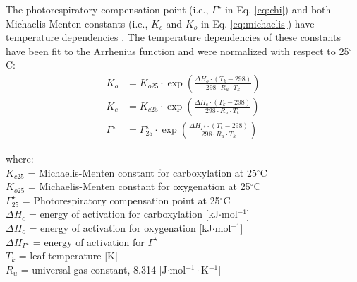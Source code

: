 \noindent The photorespiratory compensation point (i.e., $\Gamma^{\star}$ in Eq. \ref{eq:chi}) and both Michaelis-Menten constants (i.e., $K_c$ and $K_o$ in Eq. \ref{eq:michaelis}) have temperature dependencies \parencite{farquhar80}.  
The temperature dependencies of these constants have been fit to the Arrhenius function and were normalized with respect to 25$^{\circ}$C:
%
%
%
%
%
%
\begin{subequations}
\label{eq:kckogs}
\begin{align}
        K_o&=K_{o25} \cdot \exp \left( 
             \frac{\Delta H_o \cdot \left( T_k-298 \right)}
                  {298 \cdot R_{u} \cdot T_k}
             \right) \label{eq:ko} \\
        K_c&=K_{c25} \cdot \exp \left( 
             \frac{\Delta H_c \cdot \left( T_k-298 \right)}
                  {298 \cdot R_{u} \cdot T_k}
             \right) \label{eq:kc} \\
        \Gamma^{\star}&=\Gamma^{\star}_{25} \cdot \exp \left(
			\frac{\Delta H_{\Gamma^{\star}} \cdot \left( T_k - 298 \right)}
			     {298 \cdot R_{u} \cdot T_k} 	
        	\right) \label{eq:gs}
\end{align}
\end{subequations}

\noindent where:\\
\indent $K_{c25}$ = Michaelis-Menten constant for carboxylation at 25$^{\circ}$C\\
\indent $K_{o25}$ = Michaelis-Menten constant for oxygenation at 25$^{\circ}$C\\
\indent $\Gamma^{\star}_{25}$ = Photorespiratory compensation point at 25$^{\circ}$C\\
\indent $\Delta H_c$ = energy of activation for carboxylation [kJ$\cdot$mol$^{-1}$]\\
\indent $\Delta H_o$ = energy of activation for oxygenation [kJ$\cdot$mol$^{-1}$]\\
\indent $\Delta H_{\Gamma^{\star}}$ = energy of activation for $\Gamma^{\star}$\\
\indent $T_k$ = leaf temperature [K]\\
\indent $R_{u}$ = universal gas constant, 8.314 [J$\cdot$mol$^{-1}\cdot$K$^{-1}$]\\

